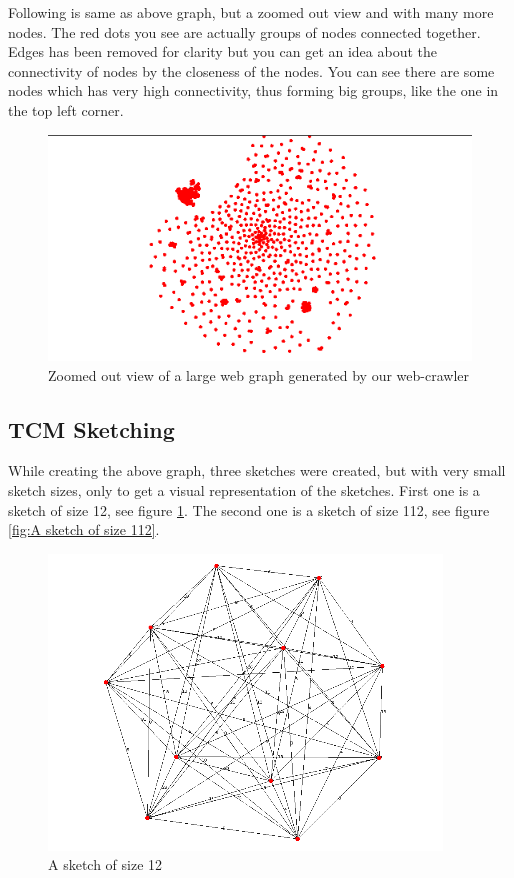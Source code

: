 \documentclass[conference]{IEEEtran}
\begin{document}
Following is same as above graph, but a zoomed out view and with many more nodes. The red dots you see are actually groups of nodes connected together. Edges has been removed for clarity but you can get an idea about the connectivity of nodes by the closeness of the nodes. You can see there are some nodes which has very high connectivity, thus forming big groups, like the one in the top left corner. 

\begin{figure}[!t]
\centering
\includegraphics[width=\linewidth]{graph2}
\caption[Zoomed out view of a large web graph]{Zoomed out view of a large web graph generated by our web-crawler}
\end{figure}

\subsection{TCM Sketching}
While creating the above graph, three sketches were created, but with very small sketch sizes, only to get a visual representation of the sketches. First one is a sketch of size 12, see figure \ref{fig:A sketch of size 12}. The second one is a sketch of size 112, see figure \ref{fig:A sketch of size 112}.


\begin{figure}[!t]
\centering
\includegraphics[width=0.6\linewidth]{s1}
\caption{A sketch of size 12}
\label{fig:A sketch of size 12}
\end{figure}
\end{document}
